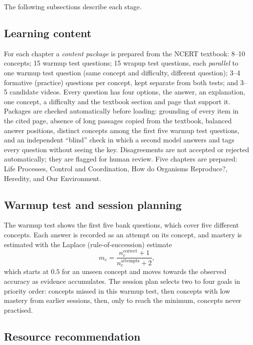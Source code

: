 The following subsections describe each stage.

\subsection{Learning content}

For each chapter a \emph{content package} is prepared from the NCERT textbook: 8--10 concepts; 15 warmup test questions;
15 wrapup test questions, each \emph{parallel} to one warmup test question (same concept and difficulty, different
question); 3--4 formative (practice) questions per concept, kept separate from both tests; and 3--5 candidate
videos. Every question has four options, the answer, an explanation, one concept, a difficulty and the textbook
section and page that support it. Packages are checked automatically before loading: grounding of every item in the
cited page, absence of long passages copied from the textbook, balanced answer positions, distinct concepts among the
first five warmup test questions, and an independent ``blind'' check in which a second model answers and tags every
question without seeing the key. Disagreements are not accepted or rejected automatically; they are flagged for human
review. Five chapters are prepared: Life Processes, Control and Coordination, How do Organisms Reproduce?,
Heredity, and Our Environment.

\subsection{Warmup test and session planning}

The warmup test shows the first five bank questions, which cover five different concepts. Each answer is recorded as an
attempt on its concept, and mastery is estimated with the Laplace (rule-of-succession) estimate
\begin{equation}
  m_{c} = \frac{n^{\text{correct}}_{c} + 1}{n^{\text{attempts}}_{c} + 2},
  \label{eq:mastery}
\end{equation}
which starts at $0.5$ for an unseen concept and moves towards the observed accuracy as evidence accumulates. The
session plan selects two to four goals in priority order: concepts missed in this warmup test, then concepts with low
mastery from earlier sessions, then, only to reach the minimum, concepts never practised.

\subsection{Resource recommendation}

